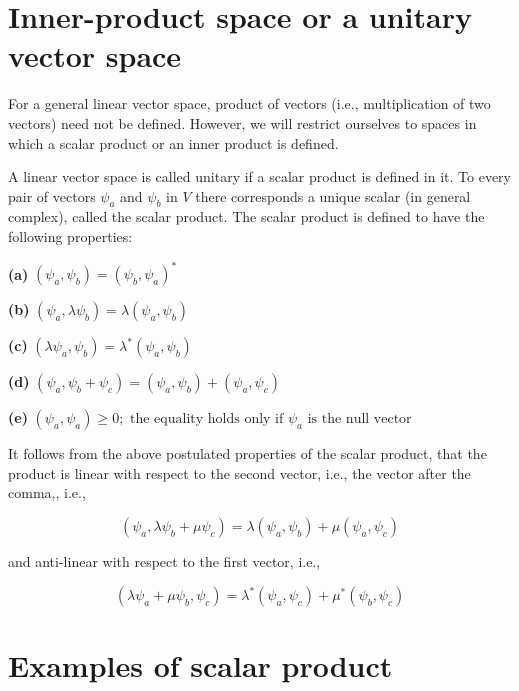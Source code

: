 \section{Inner-product space or a unitary vector space}
\label{sec:innerproduct}

For a general linear vector space, product of vectors (i.e., multiplication of two vectors) need not be defined. However, we will restrict ourselves to spaces in which a scalar product or an inner product is defined. \par

A linear vector space is called unitary if a scalar product is defined in it. To every pair of vectors $\psi_a$ and $\psi_b$ in $V$ there corresponds a unique scalar (in general complex), called the scalar product. The scalar product is defined to have the following properties:

\begin{description}
\item {\bf (a)} $(\psi_a,\psi_b) = (\psi_b,\psi_a)^\ast$
\item {\bf (b)} $(\psi_a,\lambda\psi_b) = \lambda(\psi_a,\psi_b)$
\item {\bf (c)} $(\lambda\psi_a,\psi_b) = \lambda^\ast(\psi_a,\psi_b)$
\item {\bf (d)} $(\psi_a,\psi_b+\psi_c) = (\psi_a,\psi_b)+(\psi_a,\psi_c)$
\item {\bf (e)} $(\psi_a,\psi_a) \geq 0; \text{ the equality holds only if }\psi_a\text{ is the null vector}$
\end{description}

It follows from the above postulated properties of the scalar product, that the product is linear with respect to 
the second vector, i.e., the vector after the comma,, i.e.,

$$(\psi_a,\lambda\psi_b+\mu\psi_c) = \lambda(\psi_a,\psi_b)+\mu(\psi_a,\psi_c)$$

and anti-linear with respect to the first vector, i.e.,


$$(\lambda\psi_a+\mu\psi_b,\psi_c) = \lambda^\ast(\psi_a,\psi_c)+\mu^\ast(\psi_b,\psi_c)$$



\section{Examples of scalar product}

